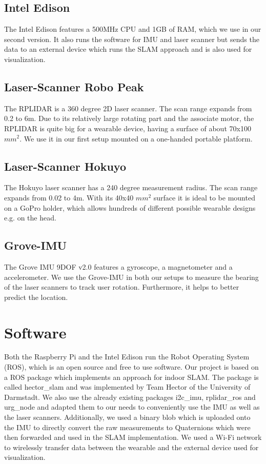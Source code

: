 \documentclass{sigchi-ext}
\begin{document}
\subsection{Intel Edison}
The Intel Edison features a 500MHz CPU and 1GB of RAM, which we use in our second version. It also runs the software for IMU and laser scanner but sends the data to an external device which runs the SLAM approach and is also used for visualization.

\subsection{Laser-Scanner Robo Peak}
The RPLIDAR is a 360 degree 2D laser scanner. The scan range expands from 0.2 to 6m. Due to its relatively large rotating part and the associate motor, the RPLIDAR is quite big for a wearable device, having a surface of about 70x100 $mm^2$. We use it in our first setup mounted on a one-handed portable platform.

\subsection{Laser-Scanner Hokuyo}
The Hokuyo laser scanner has a 240 degree measurement radius. The scan range expands from 0.02 to 4m. With its 40x40 $mm^2$ surface it is ideal to be mounted on a GoPro holder, which allows hundreds of different possible wearable designs e.g. on the head.

\subsection{Grove-IMU}
The Grove IMU 9DOF v2.0 features a gyroscope, a magnetometer and a accelerometer. We use the Grove-IMU in both our setups to measure the bearing of the laser scanners to track user rotation. Furthermore, it helps to better predict the location.

\section{Software}
Both the Raspberry Pi and the Intel Edison run the Robot Operating System (ROS), which is an open source and free to use software. Our project is based on a ROS package which implements an approach for indoor SLAM. The package is called hector\_slam and was implemented by Team Hector of the University of Darmstadt. We also use the already existing packages i2c\_imu, rplidar\_ros and urg\_node and adapted them to our needs to conveniently use the IMU as well as the laser scanners. Additionally, we used a binary blob which is uploaded onto the IMU to directly convert the raw measurements to Quaternions which were then forwarded and used in the SLAM implementation. We used a Wi-Fi network to wirelessly transfer data between the wearable and the external device used for visualization. 
\end{document}
